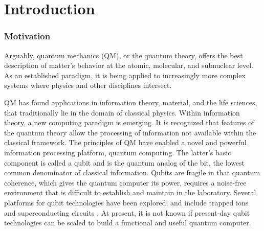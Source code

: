 \selectfont
\setcounter{chapter}{0}
\chapter{Introduction}

\label{introduction}
 
\subsection{Motivation}
Arguably, quantum mechanics (QM), or the quantum theory, offers the best description of matter's behavior at the atomic, molecular, and subnuclear level. As an established paradigm, it is being applied to increasingly more complex systems where physics and other disciplines intersect.

QM has found applications in information theory, material, and the life sciences, that traditionally lie in the domain of classical physics. Within information theory, a new computing paradigm is emerging. It is recognized that features of the quantum theory allow the processing of information \cite{QIP} not available within the classical framework.
The principles of QM have enabled a novel and powerful information processing platform, quantum computing. The latter's basic component is called a qubit \cite{quits} and is the quantum analog of the bit, the lowest common denominator of classical information. Qubits are fragile in that quantum coherence, which gives the quantum computer its power, requires a noise-free environment that is difficult to establish and maintain in the laboratory. Several platforms for qubit technologies have been explored; and
include trapped ions and superconducting circuits \cite{qubits2}. At present, it is not known if present-day qubit technologies can be scaled to build a functional and useful quantum computer.

